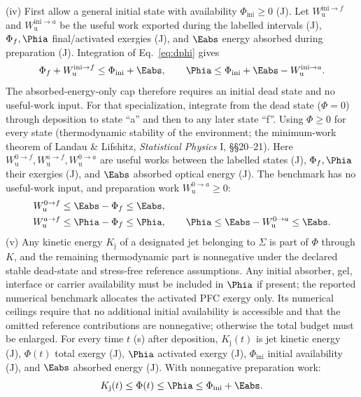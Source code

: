 (iv) First allow a general initial state with availability $\Phi_{\mathrm{ini}}\ge0$ (J).
Let $W_{\mathrm u}^{\mathrm{ini}\to f}$ and $W_{\mathrm u}^{\mathrm{ini}\to a}$ be the useful work
exported during the labelled intervals (J), $\Phi_f,\Phia$ final/activated exergies (J), and
$\Eabs$ energy absorbed during preparation (J). Integration of Eq.~\eqref{eq:dphi} gives
\begin{equation}
\Phi_f+W_{\mathrm u}^{\mathrm{ini}\to f}\le\Phi_{\mathrm{ini}}+\Eabs,\qquad
\Phia\le\Phi_{\mathrm{ini}}+\Eabs-W_{\mathrm u}^{\mathrm{ini}\to a}.
\label{eq:initial_availability}
\end{equation}
The absorbed-energy-only cap therefore requires an initial dead state and no useful-work input.
For that specialization, integrate from the dead state ($\Phi=0$) through deposition to state ``a''
and then to any later state ``f''. Using $\Phi\ge0$ for every state (thermodynamic stability of the
environment; the minimum-work theorem of Landau \& Lifshitz, \emph{Statistical Physics} I, \S\S20--21).
Here $W_{\mathrm u}^{0\to f},W_{\mathrm u}^{a\to f},W_{\mathrm u}^{0\to a}$ are useful works between
the labelled states (J), $\Phi_f,\Phia$ their exergies (J), and $\Eabs$ absorbed optical energy (J).
The benchmark has no useful-work input, and preparation work $W_{\mathrm u}^{0\to a}\ge0$:
\begin{align}
W_{\mathrm u}^{0\to f}&\le \Eabs-\Phi_f\le \Eabs,\label{eq:Wu}\\
W_{\mathrm u}^{a\to f}&\le \Phia-\Phi_f\le\Phia,\qquad \Phia\le \Eabs-W_{\mathrm u}^{0\to a}\le\Eabs .\label{eq:Wua}
\end{align}
(v) Any kinetic energy $K_{\mathrm j}$ of a designated jet belonging to $\Sigma$ is part of $\Phi$ through $K$, and
the remaining thermodynamic part is nonnegative under the declared stable dead-state and stress-free
reference assumptions. Any initial absorber, gel, interface or carrier availability must be included
in $\Phia$ if present; the reported numerical benchmark allocates the activated PFC exergy only.
Its numerical ceilings require that no additional initial availability is accessible and that
the omitted reference contributions are nonnegative; otherwise the total budget must be enlarged.
For every time $t$ (s) after deposition, $K_{\mathrm j}(t)$ is jet kinetic energy (J),
$\Phi(t)$ total exergy (J), $\Phia$ activated exergy (J), $\Phi_{\mathrm{ini}}$ initial availability
(J), and $\Eabs$ absorbed energy (J). With nonnegative preparation work:
\begin{equation}
K_{\mathrm j}(t)\le\Phi(t)\le\Phia\le\Phi_{\mathrm{ini}}+\Eabs .\label{eq:Kj}
\end{equation}

